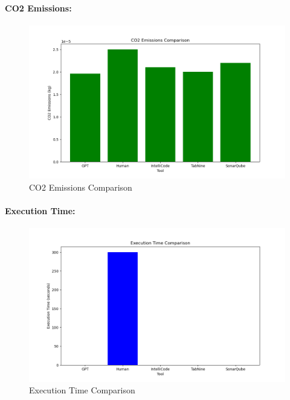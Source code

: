 \documentclass[conference,compsoc]{IEEEtran}
\begin{document}
\paragraph{CO2 Emissions:}
\begin{figure}[H]
    \centering
    \includegraphics[width=0.8\linewidth]{figures/co2_emissions_comparison.png}
    \caption{CO2 Emissions Comparison}
    \label{fig:co2_emissions_comparison}
\end{figure}

\paragraph{Execution Time:}
\begin{figure}[H]
    \centering
    \includegraphics[width=0.8\linewidth]{figures/execution_time_comparison.png}
    \caption{Execution Time Comparison}
    \label{fig:execution_time_comparison}
\end{figure}
\end{document}

